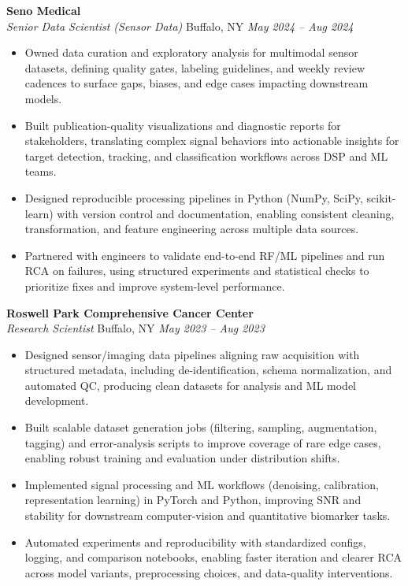 \vspace*{-1pt}
\item \textbf{Seno Medical}\\
\textit{Senior Data Scientist (Sensor Data)} \hfill Buffalo, NY \quad \textit{May 2024 -- Aug 2024}
\vspace*{-3pt}
\begin{itemize}[leftmargin=0.2in, topsep=1pt]
  \item Owned data curation and exploratory analysis for multimodal sensor datasets, defining quality gates, labeling guidelines, and weekly review cadences to surface gaps, biases, and edge cases impacting downstream models.
  \item Built publication-quality visualizations and diagnostic reports for stakeholders, translating complex signal behaviors into actionable insights for target detection, tracking, and classification workflows across DSP and ML teams.
  \item Designed reproducible processing pipelines in Python (NumPy, SciPy, scikit-learn) with version control and documentation, enabling consistent cleaning, transformation, and feature engineering across multiple data sources.
  \item Partnered with engineers to validate end-to-end RF/ML pipelines and run RCA on failures, using structured experiments and statistical checks to prioritize fixes and improve system-level performance.
\end{itemize}

\vspace*{-1pt}
\item \textbf{Roswell Park Comprehensive Cancer Center}\\
\textit{Research Scientist} \hfill Buffalo, NY \quad \textit{May 2023 -- Aug 2023}
\vspace*{-3pt}
\begin{itemize}[leftmargin=0.2in, topsep=1pt]
  \item Designed sensor/imaging data pipelines aligning raw acquisition with structured metadata, including de-identification, schema normalization, and automated QC, producing clean datasets for analysis and ML model development.
  \item Built scalable dataset generation jobs (filtering, sampling, augmentation, tagging) and error-analysis scripts to improve coverage of rare edge cases, enabling robust training and evaluation under distribution shifts.
  \item Implemented signal processing and ML workflows (denoising, calibration, representation learning) in PyTorch and Python, improving SNR and stability for downstream computer-vision and quantitative biomarker tasks.
  \item Automated experiments and reproducibility with standardized configs, logging, and comparison notebooks, enabling faster iteration and clearer RCA across model variants, preprocessing choices, and data-quality interventions.
\end{itemize}

